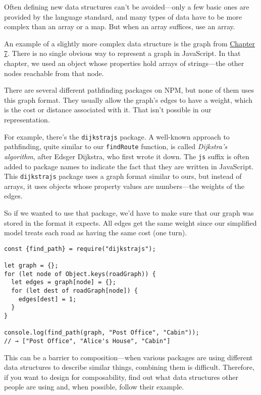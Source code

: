 Often defining new data structures can't be avoided—only a few basic ones are provided by the language standard, and many types of data have to be more complex than an array or a map. But when an array suffices, use an array.

An example of a slightly more complex data structure is the graph from \hyperref[robot]{Chapter 7}. There is no single obvious way to represent a graph in JavaScript. In that chapter, we used an object whose properties hold arrays of strings—the other nodes reachable from that node.

There are several different pathfinding packages on NPM, but none of them uses this graph format. They usually allow the graph's edges to have a weight, which is the cost or distance associated with it. That isn't possible in our representation.

For example, there's the \lstinline`dijkstrajs` package. A well-known approach to pathfinding, quite similar to our \lstinline`findRoute` function, is called \emph{Dijkstra's algorithm}, after Edsger Dijkstra, who first wrote it down. The \lstinline`js` suffix is often added to package names to indicate the fact that they are written in JavaScript. This \lstinline`dijkstrajs` package uses a graph format similar to ours, but instead of arrays, it uses objects whose property values are numbers—the weights of the edges.

So if we wanted to use that package, we'd have to make sure that our graph was stored in the format it expects. All edges get the same weight since our simplified model treats each road as having the same cost (one turn).

\begin{lstlisting}
const {find_path} = require("dijkstrajs");

let graph = {};
for (let node of Object.keys(roadGraph)) {
  let edges = graph[node] = {};
  for (let dest of roadGraph[node]) {
    edges[dest] = 1;
  }
}

console.log(find_path(graph, "Post Office", "Cabin"));
// → ["Post Office", "Alice's House", "Cabin"]
\end{lstlisting}
\noindent

This can be a barrier to composition—when various packages are using different data structures to describe similar things, combining them is difficult. Therefore, if you want to design for composability, find out what data structures other people are using and, when possible, follow their example.

